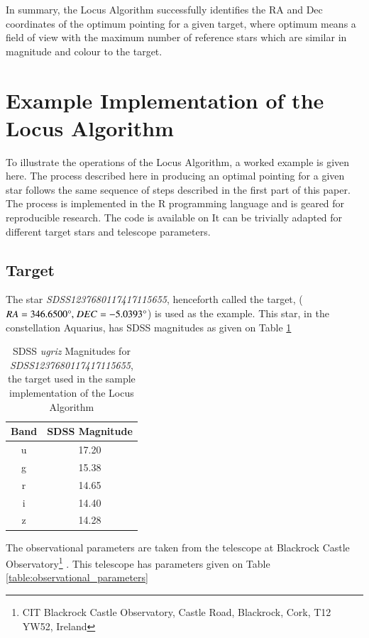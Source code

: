 \documentclass[referee]{aa}
\begin{document}
In summary, the Locus Algorithm successfully identifies the RA and Dec
coordinates of the optimum pointing for a given target, where optimum
means a field of view with the maximum number of reference stars which
are similar in magnitude and colour to the target.


\section{Example Implementation of the Locus Algorithm}
\label{example-implementation-of-the-locus-algorithm}

To illustrate the operations of the Locus Algorithm, a worked example is
given here. The process described here in producing an optimal pointing
for a given star follows the same sequence of steps described in the
first part of this paper. The process is implemented in the R
programming language and is geared for reproducible research. The code
is available on \citet{githubrepo}
It can be trivially adapted for different target stars and telescope
parameters.


\subsection{Target}
\label{target}

The star \textit{SDSS1237680117417115655}, henceforth called the target,
(${RA = 346.6500\degree,}\ {DEC = -5.0393\degree}$) is used as the example. This star, in
the constellation Aquarius, has SDSS magnitudes as given on Table \ref{table:target_mags}

\begin{table}[!htb]
\centering
\begin{tabular}{cc}
\hline\hline
Band & SDSS Magnitude\\
\hline
u & 17.20\\
g & 15.38\\
r & 14.65\\
i & 14.40\\
z & 14.28\\
\hline
\end{tabular}
 \caption{SDSS \textit{ugriz} Magnitudes for \textit{SDSS1237680117417115655}, the target used in the sample implementation of the Locus Algorithm}
 \label{table:target_mags} 
\end{table}

The observational parameters are taken from the telescope at
Blackrock Castle Observatory\footnote{CIT Blackrock Castle Observatory, Castle Road, Blackrock, Cork, T12 YW52, Ireland} . This telescope has
parameters given on Table \ref{table:observational_parameters}
\end{document}
